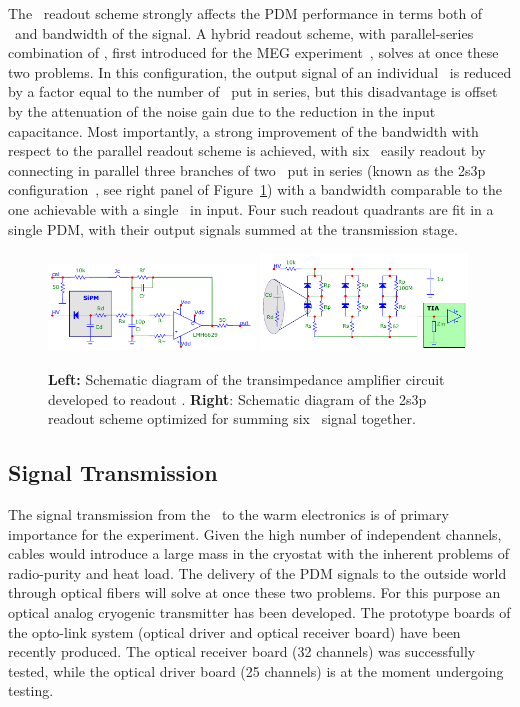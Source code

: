 The \SiPMs\ readout scheme strongly affects the PDM performance in terms both of \SNR\ and bandwidth of the signal. A hybrid readout scheme, with parallel-series combination of \SiPMs,  first introduced for the MEG experiment~\cite{Ootani:2013cn,Cattaneo:2016dq}, solves at once these two problems. In this configuration, the output signal of an individual \SiPM\ is reduced by a factor equal to the number of \SiPMs\ put in series, but this disadvantage is offset by the attenuation of the noise gain due to the reduction in the input capacitance. Most importantly, a strong improvement of the bandwidth with respect to the parallel readout scheme is achieved, with six \SiPMs\ easily readout by connecting in parallel three branches of two \SiPMs\ put in series (known as the 2s3p configuration~\cite{DIncecco:2018hy}, see right panel of Figure~\ref{fig:TIA+2s3p}) with a bandwidth comparable to the one achievable with a single \SiPM\ in input. Four such readout quadrants are fit in a single PDM, with their output signals summed at the transmission stage.

\begin{figure}[t!]
\includegraphics[width=0.49\textwidth]{./Figures/tia-schem.pdf}
\includegraphics[width=0.49\textwidth]{./Figures/2s3p-schem.pdf}
\caption[Schematic of the transimpedance amplified and summing circuits]{{\bf Left:}  Schematic diagram of the transimpedance amplifier circuit developed to  readout \SiPMs.  {\bf Right}: Schematic diagram of the 2s3p readout scheme optimized for summing six \SiPM\ signal together.}
\label{fig:TIA+2s3p}
\end{figure}


\subsection{Signal Transmission}

The signal transmission from the \DSkPdms\ to the warm electronics is of primary importance for the experiment. Given the high number of independent channels, cables would introduce a large mass in the cryostat with the inherent problems of radio-purity and heat load. The delivery of the PDM signals to the outside world through optical fibers will solve at once these two problems. For this purpose an optical analog cryogenic transmitter has been developed. The prototype boards of the opto-link system (optical driver and optical receiver board) have been recently produced. The optical receiver board (32 channels) was successfully tested, while the optical driver board (25 channels) is at the moment undergoing testing.

